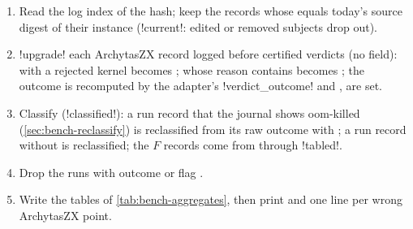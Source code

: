 \begin{algorithm}
\begin{enumerate}
\item Read the log index of the hash; keep the records whose  equals today's source
  digest of their instance (\py!current!: edited or removed subjects drop out).
\item \py!upgrade! each ArchytasZX record logged before certified verdicts (no
   field):  with a rejected kernel becomes
  ;  whose reason contains 
  becomes ; the outcome is recomputed by the adapter's
  \py!verdict_outcome! and ,  are set.
\item Classify (\py!classified!): a run record that the journal shows oom-killed
  (\cref{sec:bench-reclassify}) is reclassified from its raw outcome with
  ; a run record without  is reclassified; the $F$ records come
  from  through \py!tabled!.
\item Drop the runs with outcome  or flag .
\item Write the tables of \cref{tab:bench-aggregates}, then print  and one line  per wrong ArchytasZX point.
\end{enumerate}
\end{algorithm}

